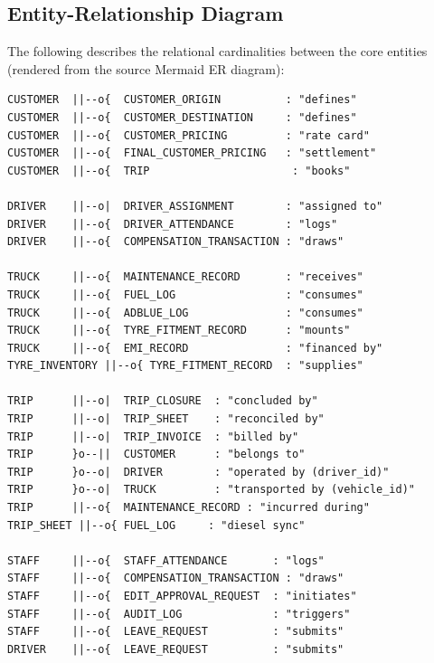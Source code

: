 \documentclass[11pt,a4paper]{article}
\begin{document}
\subsection{Entity-Relationship Diagram}
The following describes the relational cardinalities between the core entities (rendered from the source Mermaid ER diagram):

\begin{lstlisting}[style=asciiart]
CUSTOMER  ||--o{  CUSTOMER_ORIGIN          : "defines"
CUSTOMER  ||--o{  CUSTOMER_DESTINATION     : "defines"
CUSTOMER  ||--o{  CUSTOMER_PRICING         : "rate card"
CUSTOMER  ||--o{  FINAL_CUSTOMER_PRICING   : "settlement"
CUSTOMER  ||--o{  TRIP                      : "books"

DRIVER    ||--o|  DRIVER_ASSIGNMENT        : "assigned to"
DRIVER    ||--o{  DRIVER_ATTENDANCE        : "logs"
DRIVER    ||--o{  COMPENSATION_TRANSACTION : "draws"

TRUCK     ||--o{  MAINTENANCE_RECORD       : "receives"
TRUCK     ||--o{  FUEL_LOG                 : "consumes"
TRUCK     ||--o{  ADBLUE_LOG               : "consumes"
TRUCK     ||--o{  TYRE_FITMENT_RECORD      : "mounts"
TRUCK     ||--o{  EMI_RECORD               : "financed by"
TYRE_INVENTORY ||--o{ TYRE_FITMENT_RECORD  : "supplies"

TRIP      ||--o|  TRIP_CLOSURE  : "concluded by"
TRIP      ||--o|  TRIP_SHEET    : "reconciled by"
TRIP      ||--o|  TRIP_INVOICE  : "billed by"
TRIP      }o--||  CUSTOMER      : "belongs to"
TRIP      }o--o|  DRIVER        : "operated by (driver_id)"
TRIP      }o--o|  TRUCK         : "transported by (vehicle_id)"
TRIP      ||--o{  MAINTENANCE_RECORD : "incurred during"
TRIP_SHEET ||--o{ FUEL_LOG     : "diesel sync"

STAFF     ||--o{  STAFF_ATTENDANCE       : "logs"
STAFF     ||--o{  COMPENSATION_TRANSACTION : "draws"
STAFF     ||--o{  EDIT_APPROVAL_REQUEST  : "initiates"
STAFF     ||--o{  AUDIT_LOG              : "triggers"
STAFF     ||--o{  LEAVE_REQUEST          : "submits"
DRIVER    ||--o{  LEAVE_REQUEST          : "submits"
\end{lstlisting}
\end{document}
